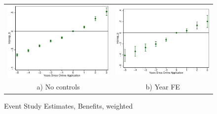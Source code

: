 \documentclass[11pt,letterpaper]{article}
\begin{document}
\begin{figure}\caption{Event Study Estimates, Benefits, weighted}
\begin{tabular}{cc}
\includegraphics[scale=0.57]{tabfig/evstu_snap_t_total_pop_notr_5_3}&\includegraphics[scale=0.57]{tabfig/evstu_snap_t_total_pop_year_5_3}\\
a) No controls&b) Year FE\\

\end{tabular}
\end{figure}
\end{document}
